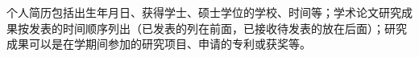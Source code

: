 \begin{resume}
    个人简历包括出生年月日、获得学士、硕士学位的学校、时间等；学术论文研究成果按发表的时间顺序列出（已发表的列在前面，已接收待发表的放在后面）；研究成果可以是在学期间参加的研究项目、申请的专利或获奖等。
\end{resume}

